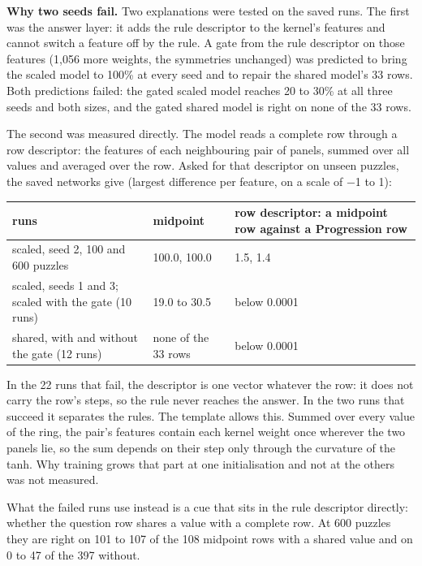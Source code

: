 \textbf{Why two seeds fail.} Two explanations were tested on the saved runs. The first was the answer layer: it adds the rule descriptor to the kernel's features and cannot switch a feature off by the rule. A gate from the rule descriptor on those features (1,056 more weights, the symmetries unchanged) was predicted to bring the scaled model to 100\% at every seed and to repair the shared model's 33 rows. Both predictions failed: the gated scaled model reaches 20 to 30\% at all three seeds and both sizes, and the gated shared model is right on none of the 33 rows.

The second was measured directly. The model reads a complete row through a row descriptor: the features of each neighbouring pair of panels, summed over all values and averaged over the row. Asked for that descriptor on unseen puzzles, the saved networks give (largest difference per feature, on a scale of −1 to 1):

\begin{center}\small
\begin{tabularx}{\linewidth}{@{}YYY@{}}
\toprule
runs & midpoint & row descriptor: a midpoint row against a Progression row \\
\midrule
scaled, seed 2, 100 and 600 puzzles & 100.0, 100.0 & 1.5, 1.4 \\
scaled, seeds 1 and 3; scaled with the gate (10 runs) & 19.0 to 30.5 & below 0.0001 \\
shared, with and without the gate (12 runs) & none of the 33 rows & below 0.0001 \\
\bottomrule
\end{tabularx}
\end{center}

In the 22 runs that fail, the descriptor is one vector whatever the row: it does not carry the row's steps, so the rule never reaches the answer. In the two runs that succeed it separates the rules. The template allows this. Summed over every value of the ring, the pair's features contain each kernel weight once wherever the two panels lie, so the sum depends on their step only through the curvature of the tanh. Why training grows that part at one initialisation and not at the others was not measured.

What the failed runs use instead is a cue that sits in the rule descriptor directly: whether the question row shares a value with a complete row. At 600 puzzles they are right on 101 to 107 of the 108 midpoint rows with a shared value and on 0 to 47 of the 397 without.

